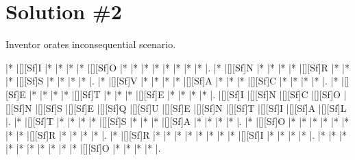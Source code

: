 \documentclass[letterpaper]{article}
\begin{document}
\newpage

\section*{Solution \#2}

Inventor orates inconsequential scenario.

\vspace*{0.5cm}
\begin{Puzzle}{15}{10}
|*        |[][Sf]I  |*        |*        |*        |*        |[][Sf]O  |*        |*        |*        |*        |*        |*        |*        |*        |.
|*        |[][Sf]N  |*        |*        |*        |*        |[][Sf]R  |*        |*        |*        |[][Sf]S  |*        |*        |*        |*        |.
|*        |[][Sf]V  |*        |*        |*        |*        |[][Sf]A  |*        |*        |*        |[][Sf]C  |*        |*        |*        |*        |.
|*        |[][Sf]E  |*        |*        |*        |*        |[][Sf]T  |*        |*        |*        |[][Sf]E  |*        |*        |*        |*        |.
|[][Sf]I  |[][Sf]N  |[][Sf]C  |[][Sf]O  |[][Sf]N  |[][Sf]S  |[][Sf]E  |[][Sf]Q  |[][Sf]U  |[][Sf]E  |[][Sf]N  |[][Sf]T  |[][Sf]I  |[][Sf]A  |[][Sf]L  |.
|*        |[][Sf]T  |*        |*        |*        |*        |[][Sf]S  |*        |*        |*        |[][Sf]A  |*        |*        |*        |*        |.
|*        |[][Sf]O  |*        |*        |*        |*        |*        |*        |*        |*        |[][Sf]R  |*        |*        |*        |*        |.
|*        |[][Sf]R  |*        |*        |*        |*        |*        |*        |*        |*        |[][Sf]I  |*        |*        |*        |*        |.
|*        |*        |*        |*        |*        |*        |*        |*        |*        |*        |[][Sf]O  |*        |*        |*        |*        |.
\end{Puzzle}
\end{document}
